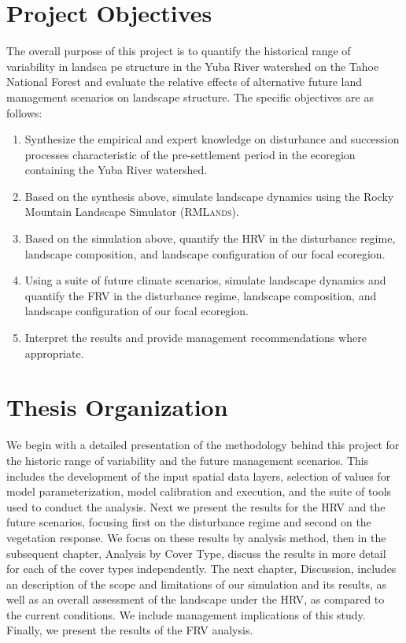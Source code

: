 \section{Project Objectives}
The overall purpose of this project is to quantify the historical range of variability in landsca pe structure in the Yuba River watershed on the Tahoe National Forest and evaluate the relative effects of  alternative future land management scenarios on landscape structure. The specific objectives are as follows:
\begin{enumerate}
	\item Synthesize the empirical and expert knowledge on disturbance and succession processes characteristic of the pre-settlement period in the ecoregion containing the Yuba River watershed.
	\item Based on the synthesis above, simulate landscape dynamics using the Rocky Mountain Landscape Simulator (\textsc{RMLands}).
	\item Based on the simulation above, quantify the HRV in the disturbance regime, landscape composition, and landscape configuration of our focal ecoregion.
	\item Using a suite of future climate scenarios, simulate landscape dynamics and quantify the FRV in the disturbance regime, landscape composition, and landscape configuration of our focal ecoregion.
	\item Interpret the results and provide management recommendations where appropriate.
\end{enumerate}


\section{Thesis Organization}

We begin with a detailed presentation of the methodology behind this project for the historic range of variability and the future management scenarios. This includes the development of the input spatial data layers, selection of values for model parameterization, model calibration and execution, and the suite of tools used to conduct the analysis. Next we present the results for the HRV and the future scenarios, focusing first on the disturbance regime and second on the vegetation response. We focus on these results by analysis method, then in the subsequent chapter, Analysis by Cover Type, discuss the results in more detail for each of the cover types independently. The next chapter, Discussion, includes an description of the scope and limitations of our simulation and its results, as well as an overall assessment of the landscape under the HRV, as compared to the current conditions. We include management implications of this study. Finally, we present the results of the FRV analysis.
